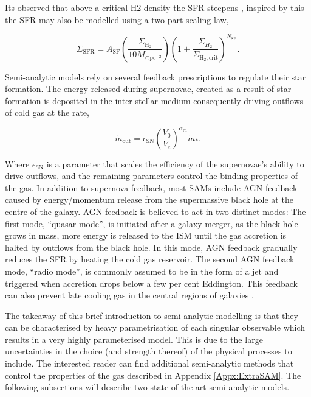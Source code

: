 Its observed that above a critical H2 density the SFR steepens \citep{Narayanan2012ALaw}, inspired by this the SFR may also be modelled using a two part scaling law, 

\begin{equation}
    \Sigma_{\mathrm{SFR}}=A_{\mathrm{SF}}\left(\frac{\Sigma_{\mathrm{H}_{2}}}{10 M_{\odot \mathrm{pc}^{-2}}}\right)\left(1+\frac{\Sigma_{H_{2}}}{\Sigma_{\mathrm{H}_{2}, \mathrm{crit}}}\right)^{N_{\mathrm{SP}}}.
\end{equation}

Semi-analytic models rely on several feedback prescriptions to regulate their star formation. The energy released during supernovae, created as a result of star formation is deposited in the inter stellar medium consequently driving outflows of cold gas at the rate,

\begin{equation}
    \dot{m}_{\mathrm{out}}=\epsilon_{\mathrm{SN}}\left(\frac{V_{0}}{V_{c}}\right)^{\alpha_{\mathrm{rh}}} \dot{m}_{*}.
\end{equation}

Where $\epsilon_{\mathrm{SN}}$ is a parameter that scales the efficiency of the supernovae's ability to drive outflows, and the remaining parameters control the binding properties of the gas. In addition to supernova feedback, most SAMs include AGN feedback caused by energy/momentum release from the supermassive black hole at the centre of the galaxy. AGN feedback is believed to act in two distinct modes: The first mode, ``quasar mode'', is initiated after a galaxy merger, as the black hole grows in mass, more energy is released to the ISM until the gas accretion is halted by outflows from the black hole. In this mode, AGN feedback gradually reduces the SFR by heating the cold gas reservoir. The second AGN feedback mode, ``radio mode'', is commonly assumed to be in the form of a jet and triggered when accretion drops below a few per cent Eddington. This feedback can also prevent late cooling gas in the central regions of galaxies \cite{Croton2007Thequenching}.

The takeaway of this brief introduction to semi-analytic modelling is that they can be characterised by heavy parametrisation of each singular observable which results in a very highly parameterised model. This is due to the large uncertainties in the choice (and strength thereof) of the physical processes to include. The interested reader can find additional semi-analytic methods that control the properties of the gas described in Appendix \ref{Appx:ExtraSAM}. The following subsections will describe two state of the art semi-analytic models.

